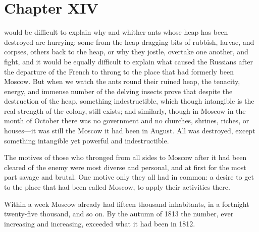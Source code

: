 
\chapter*{Chapter XIV}
\ifaudio 
{}
\fi

 would be difficult to explain why and whither ants whose heap
has been destroyed are hurrying: some from the heap dragging bits
of rubbish, larvae, and corpses, others back to the heap, or why
they jostle, overtake one another, and fight, and it would be
equally difficult to explain what caused the Russians after the
departure of the French to throng to the place that had formerly
been Moscow. But when we watch the ants round their ruined heap,
the tenacity, energy, and immense number of the delving insects
prove that despite the destruction of the heap, something
indestructible, which though intangible is the real strength of
the colony, still exists; and similarly, though in Moscow in the
month of October there was no government and no churches,
shrines, riches, or houses---it was still the Moscow it had been
in August. All was destroyed, except something intangible yet
powerful and indestructible.

The motives of those who thronged from all sides to Moscow after
it had been cleared of the enemy were most diverse and personal,
and at first for the most part savage and brutal. One motive only
they all had in common: a desire to get to the place that had
been called Moscow, to apply their activities there.

Within a week Moscow already had fifteen thousand inhabitants, in
a fortnight twenty-five thousand, and so on. By the autumn of
1813 the number, ever increasing and increasing, exceeded what it
had been in 1812.

